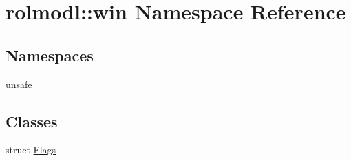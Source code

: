 \hypertarget{namespacerolmodl_1_1win}{}\section{rolmodl\+::win Namespace Reference}
\label{namespacerolmodl_1_1win}
\subsection*{Namespaces}
\begin{DoxyCompactItemize}
\item 
 \mbox{\hyperlink{namespacerolmodl_1_1win_1_1unsafe}{unsafe}}
\end{DoxyCompactItemize}
\subsection*{Classes}
\begin{DoxyCompactItemize}
\item 
struct \mbox{\hyperlink{structrolmodl_1_1win_1_1_flags}{Flags}}
\end{DoxyCompactItemize}
